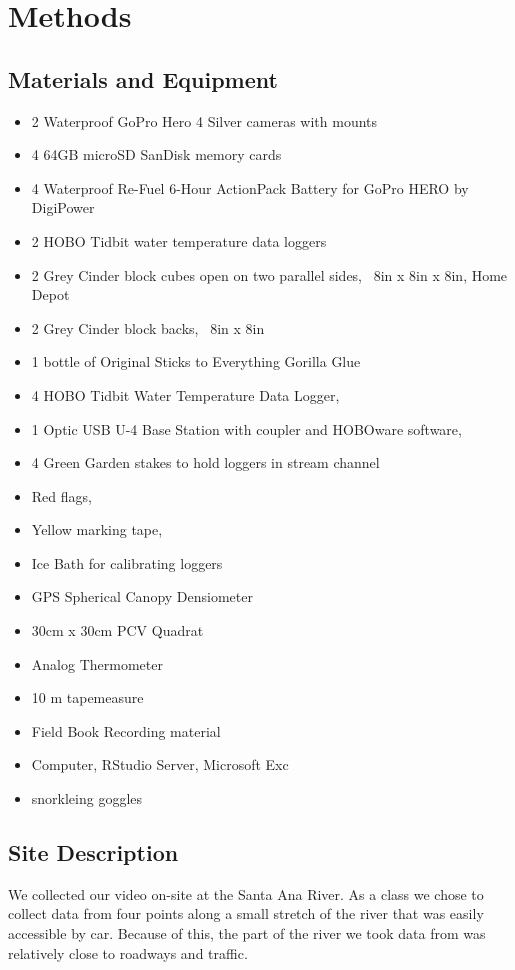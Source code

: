 \documentclass{article}\usepackage[]{graphicx}\usepackage[]{color}
\begin{document}
\section{Methods}

\subsection{Materials and Equipment}
\begin{itemize}
\item 2 Waterproof GoPro Hero 4 Silver cameras with mounts
\item 4 64GB microSD SanDisk memory cards
\item 4 Waterproof Re-Fuel 6-Hour ActionPack Battery for GoPro HERO by DigiPower
\item 2 HOBO Tidbit water temperature data loggers
\item 2 Grey Cinder block cubes open on two parallel sides, ~8in x 8in x 8in, Home Depot
\item 2 Grey Cinder block backs, ~8in x 8in
\item 1 bottle of Original Sticks to Everything Gorilla Glue
\item 4 HOBO Tidbit Water Temperature Data Logger,
\item 1 Optic USB U-4 Base Station with coupler and HOBOware software,
\item 4 Green Garden stakes to hold loggers in stream channel
\item Red flags,
\item Yellow marking tape,
\item Ice Bath for calibrating loggers
\item GPS Spherical Canopy Densiometer
\item 30cm x 30cm PCV Quadrat
\item Analog Thermometer
\item 10 m tapemeasure
\item Field Book Recording material
\item Computer, RStudio Server, Microsoft Exc
\item snorkleing goggles 

\end{itemize}

\subsection{Site Description}

We collected our video on-site at the Santa Ana River. As a class we chose to collect data from four points along a small stretch of the river that was easily accessible by car. Because of this, the part of the river we took data from was relatively close to roadways and traffic. 
\end{document}
